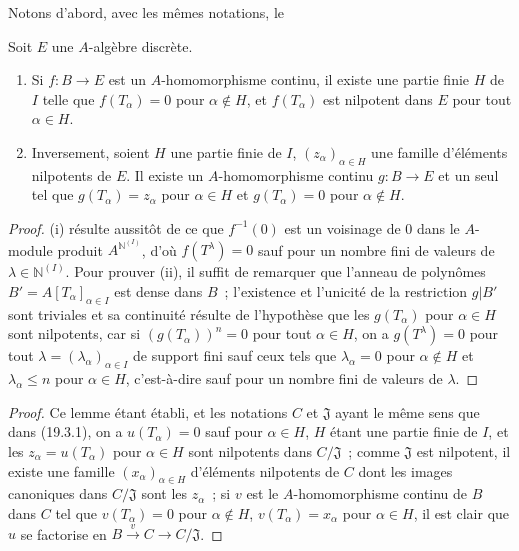 Notons d'abord, avec les mêmes notations, le
\begin{lemma}[19.3.4.1]
\label{0.19.3.4.1-fr}
Soit $E$ une $A$-algèbre discrète.
\begin{enumerate}
  \item[\textup{(i)}] Si $f:B\to E$ est un $A$-homomorphisme continu, il existe une
  partie finie $H$ de $I$ telle que $f(T_\alpha)=0$ pour $\alpha\notin H$,
  et $f(T_\alpha)$ est nilpotent dans $E$ pour tout $\alpha\in H$.
  \item[\textup{(ii)}] Inversement, soient $H$ une partie finie de $I$,
  $(z_\alpha)_{\alpha\in H}$ une famille d'éléments nilpotents de $E$.
  Il existe un $A$-homomorphisme continu $g:B\to E$ et un seul tel que
  $g(T_\alpha)=z_\alpha$ pour $\alpha\in H$ et
  $g(T_\alpha)=0$ pour $\alpha\notin H$.
\end{enumerate}
\end{lemma}

\begin{proof}
(i) résulte aussitôt de ce que $f^{-1}(0)$ est un voisinage de $0$ dans le
$A$-module produit $A^{\mathbb{N}^{(I)}}$, d'où $f(T^\lambda)=0$ sauf pour un
nombre fini de valeurs de $\lambda\in\mathbb{N}^{(I)}$. Pour prouver (ii), il
suffit de remarquer que l'anneau de polynômes
$B'=A[T_\alpha]_{\alpha\in I}$ est dense dans $B$~; l'existence et
l'unicité de la restriction $g|B'$ sont triviales et sa continuité résulte de
l'hypothèse que les $g(T_\alpha)$ pour $\alpha\in H$ sont nilpotents,
car si $(g(T_\alpha))^n=0$ pour tout $\alpha\in H$, on a
$g(T^\lambda)=0$ pour tout $\lambda=(\lambda_\alpha)_{\alpha\in I}$ de
support fini sauf ceux tels que $\lambda_\alpha=0$ pour
$\alpha\notin H$ et $\lambda_\alpha\leq n$ pour
$\alpha\in H$, c'est-à-dire sauf pour un nombre fini de valeurs de
$\lambda$.
\end{proof}

\begin{proof}
Ce lemme étant établi, et les notations $C$ et $\mathfrak J$ ayant le même
sens que dans (19.3.1), on a $u(T_\alpha)=0$ sauf pour
$\alpha\in H$, $H$ étant une partie finie de $I$, et les
$z_\alpha=u(T_\alpha)$ pour $\alpha\in H$ sont nilpotents dans
$C/\mathfrak J$~; comme $\mathfrak J$ est nilpotent, il existe une famille
$(x_\alpha)_{\alpha\in H}$ d'éléments nilpotents de $C$ dont les images
canoniques dans $C/\mathfrak J$ sont les $z_\alpha$~; si $v$ est le
$A$-homomorphisme continu de $B$ dans $C$ tel que
$v(T_\alpha)=0$ pour $\alpha\notin H$, $v(T_\alpha)=x_\alpha$ pour
$\alpha\in H$, il est clair que $u$ se factorise en
$B\xrightarrow{v}C\to C/\mathfrak J$.
\end{proof}

